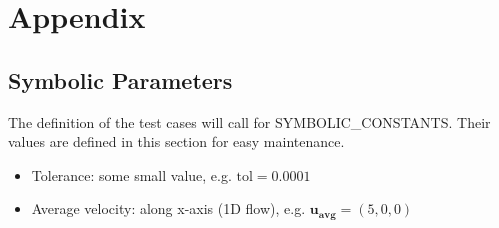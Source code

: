 \documentclass[12pt, titlepage]{article}
\begin{document}




\newpage

\section{Appendix}


\subsection{Symbolic Parameters} \label{secSymParams}

The definition of the test cases will call for SYMBOLIC\_CONSTANTS.
Their values are defined in this section for easy maintenance.

\begin{itemize}
  \item Tolerance: some small value, e.g. $\text{tol}=0.0001$
  \item Average velocity: along x-axis (1D flow), e.g. $\mathbf{u_{avg}}=(5,0,0)$
\end{itemize}








\end{document}
